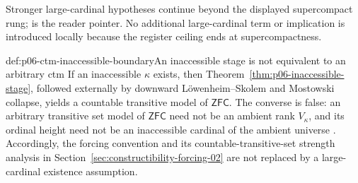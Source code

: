 Stronger large-cardinal hypotheses continue beyond the displayed
supercompact rung; \cite{Kanamori2003} is the reader pointer.  No additional
large-cardinal term or implication is introduced locally because the register
ceiling ends at supercompactness.

\begin{hbwarning}{def:p06-ctm-inaccessible-boundary}{An inaccessible stage is not equivalent to an arbitrary ctm}
If an inaccessible \(\kappa\) exists, then
Theorem~\ref{thm:p06-inaccessible-stage}, followed externally by downward
L\"owenheim--Skolem and Mostowski collapse, yields a countable transitive
model of \(\mathsf{ZFC}\).  The converse is false: an arbitrary transitive set
model of \(\mathsf{ZFC}\) need not be an ambient rank \(V_\kappa\), and its
ordinal height need not be an inaccessible cardinal of the ambient universe
\cite{Jech2003,Kanamori2003}.
Accordingly, the forcing convention and its countable-transitive-set strength
analysis in Section~\ref{sec:constructibility-forcing-02} are not replaced by
a large-cardinal existence assumption.
\end{hbwarning}

